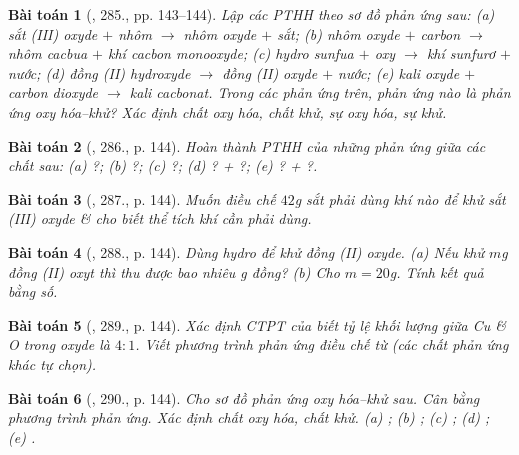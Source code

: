 \documentclass{article}
\newtheorem{baitoan}{Bài toán}
\begin{document}
\begin{baitoan}[\cite{An_400_BT_Hoa_Hoc_8_2020}, 285., pp. 143--144]
	Lập các PTHH theo sơ đồ phản ứng sau: (a) sắt (III) oxyde $+$ nhôm $\to$ nhôm oxyde $+$ sắt; (b) nhôm oxyde $+$ carbon $\to$ nhôm cacbua $+$ khí cacbon monooxyde; (c) hydro sunfua $+$ oxy $\to$ khí sunfurơ $+$ nước; (d) đồng (II) hydroxyde $\to$ đồng (II) oxyde $+$ nước; (e) kali oxyde $+$ carbon dioxyde $\to$ kali cacbonat. Trong các phản ứng trên, phản ứng nào là phản ứng oxy hóa--khử? Xác định chất oxy hóa, chất khử, sự oxy hóa, sự khử.
\end{baitoan}

\begin{baitoan}[\cite{An_400_BT_Hoa_Hoc_8_2020}, 286., p. 144]
	Hoàn thành PTHH của những phản ứng giữa các chất sau: (a) \emph{} ?; (b) \emph{} ?; (c) \emph{} ?; (d) \emph{} ? + ?; (e) \emph{} ? + ?.
\end{baitoan}

\begin{baitoan}[\cite{An_400_BT_Hoa_Hoc_8_2020}, 287., p. 144]
	Muốn điều chế $42$\emph{g} sắt phải dùng khí nào để khử sắt (III) oxyde \& cho biết thể tích khí cần phải dùng.
\end{baitoan}

\begin{baitoan}[\cite{An_400_BT_Hoa_Hoc_8_2020}, 288., p. 144]
	Dùng hydro để khử đồng (II) oxyde. (a) Nếu khử $m$\emph{g} đồng (II) oxyt thì thu được bao nhiêu \emph{g} đồng? (b) Cho $m = 20$\emph{g}. Tính kết quả bằng số.
\end{baitoan}

\begin{baitoan}[\cite{An_400_BT_Hoa_Hoc_8_2020}, 289., p. 144]
	Xác định CTPT của \emph{} biết tỷ lệ khối lượng giữa \emph{Cu} \& \emph{O} trong oxyde là $4:1$. Viết phương trình phản ứng điều chế \emph{} từ \emph{} (các chất phản ứng khác tự chọn).
\end{baitoan}

\begin{baitoan}[\cite{An_400_BT_Hoa_Hoc_8_2020}, 290., p. 144]
	Cho sơ đồ phản ứng oxy hóa--khử sau. Cân bằng phương trình phản ứng. Xác định chất oxy hóa, chất khử. (a) \emph{}; (b) \emph{}; (c) \emph{}; (d) \emph{}; (e) \emph{}.
\end{baitoan}
\end{document}
